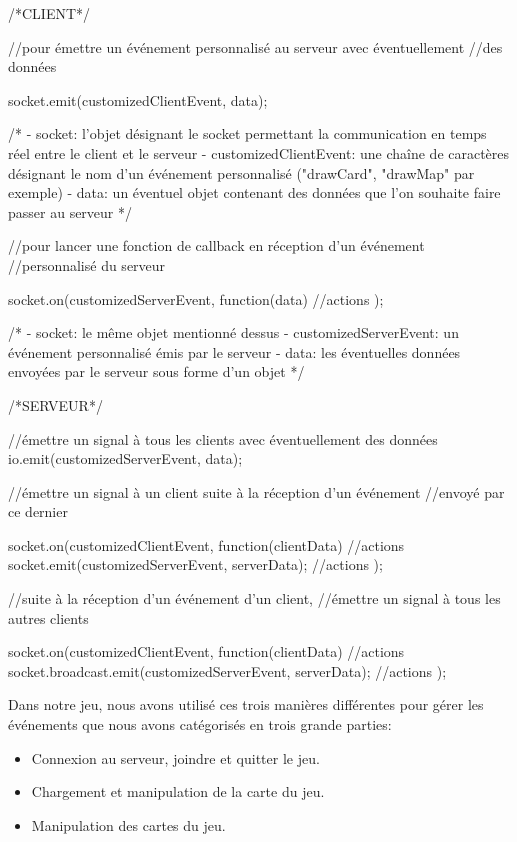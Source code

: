 \documentclass[12pt]{report}
\begin{document}
		\begin{verbatimtab}[4]
		/*CLIENT*/

		//pour émettre un événement personnalisé au serveur avec éventuellement
		//des données

		socket.emit(customizedClientEvent, data);

		/*
			- socket: l'objet désignant le socket permettant la communication en
			temps réel entre le client et le serveur
			- customizedClientEvent: une chaîne de caractères désignant le nom d'un
			événement personnalisé ("drawCard", "drawMap" par exemple)
			- data: un éventuel objet contenant des données que l'on souhaite
			faire passer au serveur
		*/

		//pour lancer une fonction de callback en réception d'un événement
		//personnalisé du serveur

		socket.on(customizedServerEvent, function(data){
			//actions
		});

		/*
			- socket: le même objet mentionné dessus
			- customizedServerEvent: un événement personnalisé émis par le serveur
			- data: les éventuelles données envoyées par le serveur
			sous forme d'un objet
		*/

		/*SERVEUR*/

		//émettre un signal à tous les clients avec éventuellement des données
		io.emit(customizedServerEvent, data);

		//émettre un signal à un client suite à la réception d'un événement
		//envoyé par ce dernier

		socket.on(customizedClientEvent, function(clientData){
			//actions
			socket.emit(customizedServerEvent, serverData);
			//actions
		});

		//suite à la réception d'un événement d'un client,
		//émettre un signal à tous les autres clients

		socket.on(customizedClientEvent, function(clientData){
			//actions
			socket.broadcast.emit(customizedServerEvent, serverData);
			//actions
		});
		\end{verbatimtab}

		Dans notre jeu, nous avons utilisé ces trois manières différentes pour gérer les événements que nous avons catégorisés en trois grande parties:
		\begin{itemize}
			\item{Connexion au serveur, joindre et quitter le jeu.}
			\item{Chargement et manipulation de la carte du jeu.}
			\item{Manipulation des cartes du jeu.}
		\end{itemize}
\end{document}

